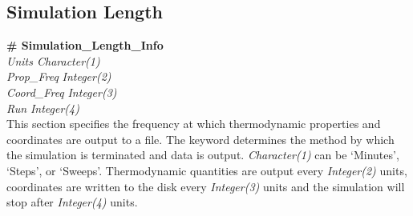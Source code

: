 \subsection{Simulation Length}\label{sec:Simulation_Length_Info}
{\bf \# Simulation\_Length\_Info} \\
{\it Units  Character(1)} \\
{\it Prop\_Freq} {\it Integer(2)} \\
{\it Coord\_Freq} {\it Integer(3)} \\
{\it Run} {\it Integer(4)} \\ 
%
This section specifies the frequency at which thermodynamic properties and coordinates are output to a file. 
The  keyword determines the method by which the simulation is terminated and data is output. 
{\it Character(1)} can be `Minutes', `Steps', or `Sweeps'. 
Thermodynamic quantities are output every {\it Integer(2)} units,
coordinates are written to the disk every {\it Integer(3)} units and 
the simulation will stop after {\it Integer(4)} units.

